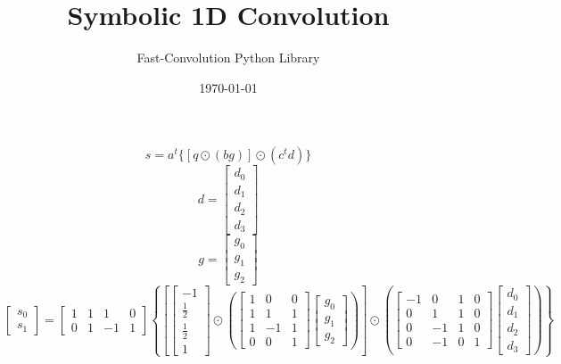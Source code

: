 \documentclass{article}%
\title{Symbolic 1D Convolution}%
\author{Fast{-}Convolution Python Library}%
\date{\today}%
\begin{document}
%
\normalsize%
\maketitle%
\[%
s = a^t \{[q \odot (bg)] \odot (c^t d)\}%
\]%
\[%
d = \left[\begin{matrix}d_{0}\\d_{1}\\d_{2}\\d_{3}\end{matrix}\right]%
\]%
\[%
g = \left[\begin{matrix}g_{0}\\g_{1}\\g_{2}\end{matrix}\right]%
\]%
\[%
\left[\begin{matrix}s_{0}\\s_{1}\end{matrix}\right] = \left[\begin{matrix}1 & 1 & 1 & 0\\0 & 1 & -1 & 1\end{matrix}\right] \left\{ \left[ \left[\begin{matrix}-1\\\frac{1}{2}\\\frac{1}{2}\\1\end{matrix}\right] \odot \left( \left[\begin{matrix}1 & 0 & 0\\1 & 1 & 1\\1 & -1 & 1\\0 & 0 & 1\end{matrix}\right] \left[\begin{matrix}g_{0}\\g_{1}\\g_{2}\end{matrix}\right] \right) \right] \odot \left( \left[\begin{matrix}-1 & 0 & 1 & 0\\0 & 1 & 1 & 0\\0 & -1 & 1 & 0\\0 & -1 & 0 & 1\end{matrix}\right] \left[\begin{matrix}d_{0}\\d_{1}\\d_{2}\\d_{3}\end{matrix}\right] \right) \right\}%
\]%
\end{document}
